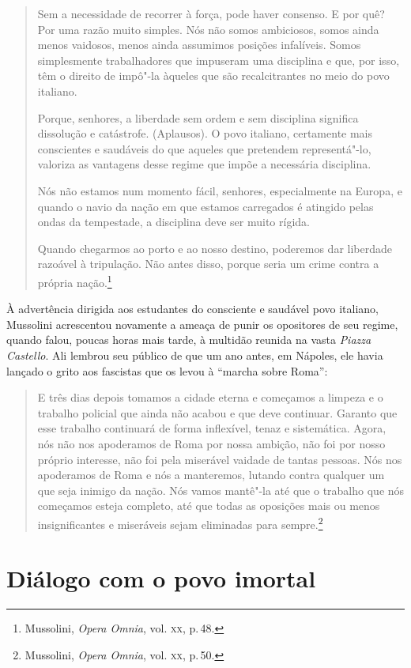 \begin{quote}
Sem a necessidade de recorrer à força, pode haver consenso. E por quê?
Por uma razão muito simples. Nós não somos ambiciosos, somos ainda menos
vaidosos, menos ainda assumimos posições infalíveis. Somos simplesmente
trabalhadores que impuseram uma disciplina e que, por isso, têm o
direito de impô"-la àqueles que são recalcitrantes no meio do povo
italiano.

Porque, senhores, a liberdade sem ordem e sem disciplina significa
dissolução e catástrofe. (Aplausos). O povo italiano, certamente mais
conscientes e saudáveis do que aqueles que pretendem representá"-lo,
valoriza as vantagens desse regime que impõe a necessária disciplina.

Nós não estamos num momento fácil, senhores, especialmente na Europa, e
quando o navio da nação em que estamos carregados é atingido pelas ondas
da tempestade, a disciplina deve ser muito rígida.

Quando chegarmos ao porto e ao nosso destino, poderemos dar liberdade
razoável à tripulação. Não antes disso, porque seria um crime contra a
própria nação.\footnote{Mussolini, \emph{Opera Omnia}, vol. \textsc{xx}, p.\,48.}
\end{quote}

À advertência dirigida aos estudantes do consciente e saudável povo
italiano, Mussolini acrescentou novamente a ameaça de punir os
opositores de seu regime, quando falou, poucas horas mais tarde, à
multidão reunida na vasta \emph{Piazza Castello}. Ali lembrou seu
público de que um ano antes, em Nápoles, ele havia lançado o grito aos
fascistas que os levou à ``marcha sobre Roma'':

\begin{quote}
E três dias depois tomamos a cidade eterna e começamos a limpeza e o
trabalho policial que ainda não acabou e que deve continuar. Garanto que
esse trabalho continuará de forma inflexível, tenaz e sistemática.
Agora, nós não nos apoderamos de Roma por nossa ambição, não foi por
nosso próprio interesse, não foi pela miserável vaidade de tantas
pessoas. Nós nos apoderamos de Roma e nós a manteremos, lutando contra
qualquer um que seja inimigo da nação. Nós vamos mantê"-la até que o
trabalho que nós começamos esteja completo, até que todas as oposições
mais ou menos insignificantes e miseráveis sejam eliminadas para
sempre.\footnote{Mussolini, \emph{Opera Omnia}, vol. \textsc{xx}, p.\,50.}
\end{quote}

\section{Diálogo com o povo imortal}

